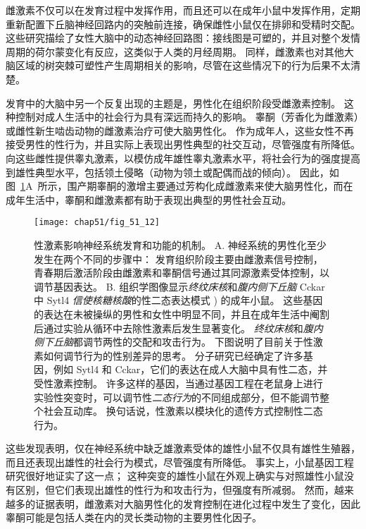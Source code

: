 雌激素不仅可以在发育过程中发挥作用，而且还可以在成年小鼠中发挥作用，定期重新配置下丘脑神经回路内的突触前连接，确保雌性小鼠仅在排卵和受精时交配。
这些研究描绘了女性大脑中的动态神经回路图：接线图是可塑的，并且对整个发情周期的荷尔蒙变化有反应，这类似于人类的月经周期。
同样，雌激素也对其他大脑区域的树突棘可塑性产生周期相关的影响，尽管在这些情况下的行为后果不太清楚。


发育中的大脑中另一个反复出现的主题是，男性化在组织阶段受雌激素控制。
这种控制对成人生活中的社会行为具有深远而持久的影响。
睾酮（芳香化为雌激素）或雌性新生啮齿动物的雌激素治疗可使大脑男性化。
作为成年人，这些女性不再接受男性的性行为，并且实际上表现出男性典型的社交互动，尽管强度有所降低。
向这些雌性提供睾丸激素，以模仿成年雄性睾丸激素水平，将社会行为的强度提高到雄性典型水平，包括领土侵略（动物为领土或配偶而战的倾向）。
因此，如图~\ref{fig:51_12}A~所示，围产期睾酮的激增主要通过芳构化成雌激素来使大脑男性化，而在成年生活中，睾酮和雌激素都有助于表现出典型的男性社会互动。


\begin{figure}[htbp]
	\centering
	\texttt{[image: chap51/fig\_51\_12]}
	\caption{性激素影响神经系统发育和功能的机制。
		A. 神经系统的男性化至少发生在两个不同的步骤中：
		发育组织阶段主要由雌激素信号控制，青春期后激活阶段由雌激素和睾酮信号通过其同源激素受体控制，以调节基因表达。
		B. 组织学图像显示\textit{终纹床核}和\textit{腹内侧下丘脑} Cckar 中 Sytl4 \textit{信使核糖核酸}的性二态表达模式 ) 的成年小鼠。
		这些基因的表达在未被操纵的男性和女性中明显不同，并且在成年生活中阉割后通过实验从循环中去除性激素后发生显著变化。
		\textit{终纹床核}和\textit{腹内侧下丘脑}都调节两性的交配和攻击行为。
		下图说明了目前关于性激素如何调节行为的性别差异的思考。
		分子研究已经确定了许多基因，例如 Sytl4 和 Cckar，它们的表达在成人大脑中具有性二态，并受性激素控制。
		许多这样的基因，当通过基因工程在老鼠身上进行实验性突变时，可以调节性\textit{二态行为}的不同组成部分，但不能调节整个社会互动库。
		换句话说，性激素以模块化的遗传方式控制性二态行为\cite{xu2012modular}。}
	\label{fig:51_12}
\end{figure}


这些发现表明，仅在神经系统中缺乏雄激素受体的雄性小鼠不仅具有雄性生殖器，而且还表现出雄性的社会行为模式，尽管强度有所降低。
事实上，小鼠基因工程研究很好地证实了这一点；
这种突变的雄性小鼠在外观上确实与对照雄性小鼠没有区别，但它们表现出雄性的性行为和攻击行为，但强度有所减弱。
然而，越来越多的证据表明，雌激素对大脑男性化的发育控制在进化过程中发生了变化，因此睾酮可能是包括人类在内的灵长类动物的主要男性化因子。


